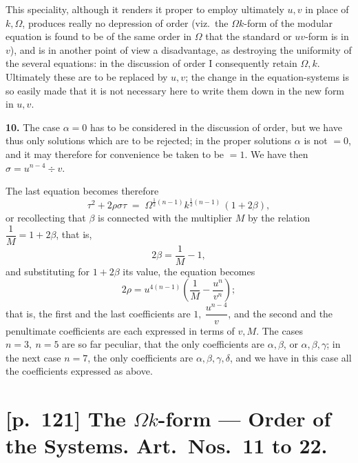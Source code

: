 \documentclass[11pt]{article}
\begin{document}
This speciality, although it renders it proper to employ ultimately
$u, v$ in place of $k, \Omega$, produces really no depression of order
(viz.\ the $\Omega k$-form of the modular equation is found to be of the
same order in $\Omega$ that the standard or $uv$-form is in $v$), and is
in another point of view a disadvantage, as destroying the uniformity of
the several equations: in the discussion of order I consequently retain
$\Omega, k$. Ultimately these are to be replaced by $u, v$; the change in
the equation-systems is so easily made that it is not necessary here to
write them down in the new form in $u, v$.

\medskip
\textbf{10.} The case $\alpha=0$ has to be considered in the discussion of
order, but we have thus only solutions which are to be rejected; in the
proper solutions $\alpha$ is not $=0$, and it may therefore for convenience
be taken to be $=1$. We have then $\sigma = u^{n-4} \div v$.

The last equation becomes therefore
\[
\tau^2 + 2\rho\sigma\tau \;=\; \Omega^{\frac{1}{2}(n-1)}k^{\frac{1}{2}(n-1)}\,(1+2\beta),
\]
or recollecting that $\beta$ is connected with the multiplier $M$ by the
relation $\dfrac{1}{M} = 1 + 2\beta$, that is,
\[
2\beta = \frac{1}{M} - 1,
\]
and substituting for $1+2\beta$ its value, the equation becomes
\[
2\rho = u^{4(n-1)}\!\left(\frac{1}{M} - \frac{u^n}{v^n}\right);
\]
that is, the first and the last coefficients are $1,\ \dfrac{u^{n-4}}{v}$,
and the second and the penultimate coefficients are each expressed in
terms of $v, M$. The cases $n=3,\ n=5$ are so far peculiar, that the only
coefficients are $\alpha,\beta$, or $\alpha,\beta,\gamma$; in the next
case $n=7$, the only coefficients are $\alpha,\beta,\gamma,\delta$, and we
have in this case all the coefficients expressed as above.

\section*{[p.~121] The $\Omega k$-form --- Order of the Systems. Art.\ Nos.\ 11 to 22.}
\end{document}
